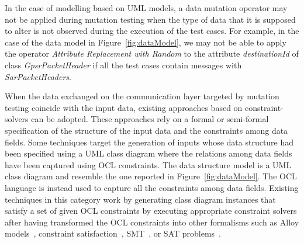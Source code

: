 In the case of modelling based on UML models, a data mutation operator may not be applied during mutation testing when the type of data that it is supposed to alter is not observed during the execution of the test cases. 
For example, in the case of the data model in Figure~\ref{fig:dataModel}, we may not be able to apply the operator \emph{Attribute Replacement with Random} to the attribute \emph{destinationId} of class \emph{GpsrPacketHeader} if all the test cases contain messages with \emph{SarPacketHeaders}.



When the data exchanged on the communication layer targeted by mutation testing coincide with the input data, existing approaches based on constraint-solvers can be adopted. 
These approaches rely on a formal or semi-formal specification of the structure of the input data and the constraints among data fields.
Some techniques target the generation of inputs whose data structure had been specified using a UML class diagram where the relations among data fields have been captured using OCL constraints. The data structure model is a UML class diagram and resemble the one reported in Figure~\ref{fig:dataModel}. The OCL language is instead used to capture all the constraints among data fields. Existing techniques in this category work by generating class diagram instances that satisfy a set of given OCL constraints by executing appropriate constraint solvers after having transformed the OCL constraints into other formalisms such as Alloy models~\cite{Uml2alloy}, constraint satisfaction~\cite{EMFTOCSP}, SMT~\cite{Przigoda2016}, or SAT problems~\cite{Soeken2011}. 

